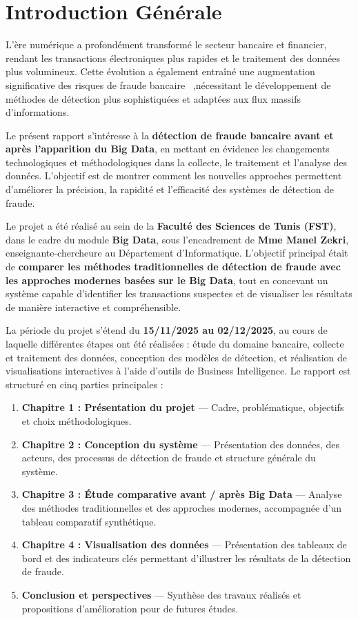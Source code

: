 \chapter*{Introduction Générale}

L’ère numérique a profondément transformé le secteur bancaire et financier,
rendant les transactions électroniques plus rapides et le traitement des données plus volumineux.
Cette évolution a également entraîné une augmentation significative des risques de fraude bancaire ~\cite{mckinsey2019},nécessitant le développement de méthodes de détection plus sophistiquées et adaptées aux flux massifs d’informations.

Le présent rapport s’intéresse à la \textbf{détection de fraude bancaire avant et après l’apparition du Big Data}, 
en mettant en évidence les changements technologiques et méthodologiques dans la collecte, le traitement et l’analyse des données. 
L’objectif est de montrer comment les nouvelles approches permettent d’améliorer la précision, la rapidité et l’efficacité des systèmes de détection de fraude.

Le projet a été réalisé au sein de la \textbf{Faculté des Sciences de Tunis (FST)}, 
dans le cadre du module \textbf{Big Data}, sous l’encadrement de \textbf{Mme Manel Zekri}, 
enseignante-chercheure au Département d’Informatique. 
L’objectif principal était de \textbf{comparer les méthodes traditionnelles de détection de fraude avec les approches modernes basées sur le Big Data}, 
tout en concevant un système capable d’identifier les transactions suspectes et de visualiser les résultats de manière interactive et compréhensible.

La période du projet s’étend du \textbf{15/11/2025 au 02/12/2025}, 
au cours de laquelle différentes étapes ont été réalisées : étude du domaine bancaire, 
collecte et traitement des données, conception des modèles de détection, 
et réalisation de visualisations interactives à l’aide d’outils de Business Intelligence.
\clearpage
Le rapport est structuré en cinq parties principales :  

\begin{enumerate}
    \item \textbf{Chapitre 1 : Présentation du projet} — Cadre, problématique, objectifs et choix méthodologiques.
    \item \textbf{Chapitre 2 : Conception du système} — Présentation des données, des acteurs, des processus de détection de fraude et structure générale du système.
    \item \textbf{Chapitre 3 : Étude comparative avant / après Big Data} — Analyse des méthodes traditionnelles et des approches modernes, accompagnée d’un tableau comparatif synthétique.
    \item \textbf{Chapitre 4 : Visualisation des données} — Présentation des tableaux de bord et des indicateurs clés permettant d’illustrer les résultats de la détection de fraude.
    \item \textbf{Conclusion et perspectives} — Synthèse des travaux réalisés et propositions d’amélioration pour de futures études.
\end{enumerate}
